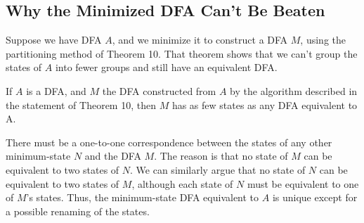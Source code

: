 \documentclass[]{article}
\begin{document}
  \subsection*{Why the Minimized DFA Can't Be Beaten}
    Suppose we have DFA $A$, and we minimize it to construct a DFA $M$, using
    the partitioning method of Theorem 10. That theorem shows that we can't
    group the states of $A$ into fewer groups and still have an equivalent DFA.
      \begin{thm}
        If $A$ is a DFA, and $M$ the DFA constructed from $A$ by the algorithm
        described in the statement of Theorem 10, then $M$ has as few states as
        any DFA equivalent to A.
      \end{thm}
    There must be a one-to-one correspondence between the states of any other
    minimum-state $N$ and the DFA $M$. The reason is that no state of $M$ can be
    equivalent to two states of $N$. We can similarly argue that no state of $N$
    can be equivalent to two states of $M$, although each state of $N$ must be
    equivalent to one of $M$'s states. Thus, the minimum-state DFA equivalent to
    $A$ is unique except for a possible renaming of the states.
\end{document}
